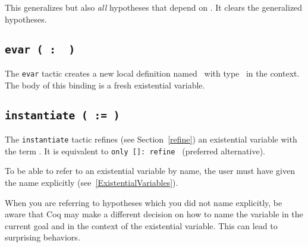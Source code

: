 \begin{coq_example*}
\begin{Variants}
  This generalizes {\term} but also {\em all} hypotheses that depend
  on {\term}. It clears the generalized hypotheses.

\end{Variants}

\subsection{\tt evar ( {\ident} :\ {\term} )}
\label{evar}

The {\tt evar} tactic creates a new local definition named \ident\ with
type \term\ in the context. The body of this binding is a fresh
existential variable.

\subsection{\tt instantiate ( {\ident} := {\term} )}
\label{instantiate}

The {\tt instantiate} tactic refines (see Section~\ref{refine})
an existential variable {\ident} with the term {\term}.
It is equivalent to {\tt only [\ident]: refine \term} (preferred alternative).

\begin{Remarks}
\item To be able to refer to an existential variable by name, the
user must have given the name explicitly (see~\ref{ExistentialVariables}).

\item When you are referring to hypotheses which you did not name
explicitly, be aware that Coq may make a different decision on how to
name the variable in the current goal and in the context of the
existential variable. This can lead to surprising behaviors.
\end{Remarks}

\end{coq_example*}
